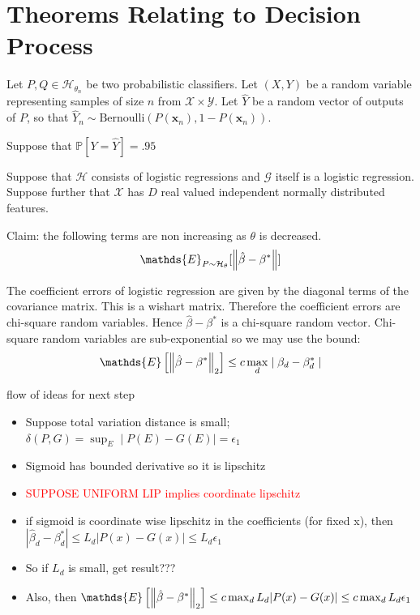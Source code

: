 \documentclass[12pt]{article}
\newenvironment{proposition}[2][Proposition]{\begin{trivlist}
\item[\hskip \labelsep {\bfseries #1}\hskip \labelsep {\bfseries #2.}]}{\end{trivlist}}
\begin{document}
\section{Theorems Relating to Decision Process}



Let $P,Q \in \mathcal{H}_{\theta_n}$ be two probabilistic classifiers. Let $(X,Y)$ be a random variable representing samples of size $n$ from $\mathcal{X}\times \mathcal{Y}$. Let $\hat{Y}$ be a random vector of outputs of $P$, so that $\hat{Y}_n \sim \text{Bernoulli}(P(\mathbf{x}_n), 1-P(\mathbf{x}_n))$.


Suppose that $\mathds{P}[Y = \hat{Y}] = .95$

\begin{proposition}{A}
    Suppose that $\mathcal{H}$ consists of logistic regressions and $\mathcal{G}$ itself is a logistic regression. Suppose further that $\mathcal{X}$ has $D$ real valued independent normally distributed features. 

    Claim: the following terms are non increasing as $\theta$ is decreased.
    \begin{equation}
        \mathds{E}_{P\sim \mathcal{H}_{\theta}}[\norm{\hat{\beta} - \beta^*}]
    \end{equation}
\end{proposition}

The coefficient errors of logistic regression are given by the diagonal terms of the covariance matrix. This is a wishart matrix. Therefore the coefficient errors are chi-square random variables. Hence $\hat{\beta} - \beta^*$ is a chi-square random vector. Chi-square random variables are sub-exponential so we may use the bound:
\begin{equation*}
    \mathds{E}\left[\norm{\hat{\beta}-\beta^*}_2\right] \leq c \max_d \mid \beta_d - \beta^*_d \mid
\end{equation*}


flow of ideas for next step
\begin{itemize}
    \item Suppose total variation distance is small; $\delta(P,G)=\sup_{E}\mid P(E) - G(E)\mid = \epsilon_1$
    \item Sigmoid has bounded derivative so it is lipschitz
    \item \textcolor{red}{SUPPOSE UNIFORM LIP implies coordinate lipschitz}
    \item if sigmoid is coordinate wise lipschitz in the coefficients (for fixed x), then $|\hat{\beta}_d - \beta^*_d| \leq L_d |P(x)-G(x)| \leq L_d \epsilon_1$
    \item So if $L_d$ is small, get result???
    \item Also, then $
    \mathds{E}\left[\norm{\hat{\beta}-\beta^*}_2\right] \leq c \max_d L_d |P(x)-G(x)| \leq c \max_d L_d \epsilon_1$
\end{itemize}
\end{document}
